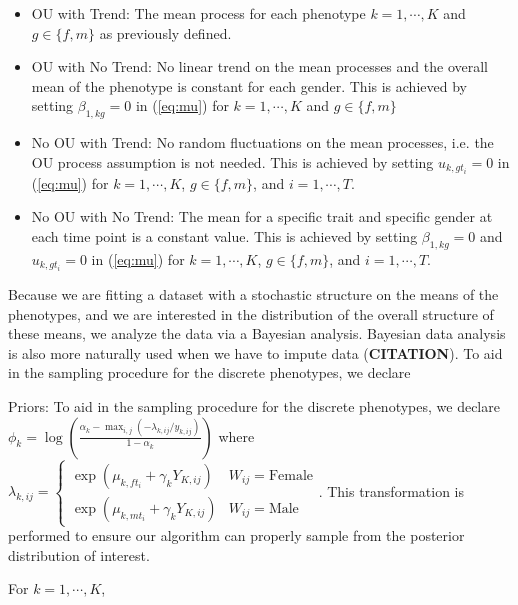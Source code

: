 \documentclass[
  12pt,
]{article}
\begin{document}
\begin{itemize}
\item OU with Trend: The mean process for each phenotype $k=1,\cdots,K$ and $g \in \{f,m\}$ as previously defined.
\item OU with No Trend: No linear trend on the mean processes and the overall mean of the phenotype is constant for each gender. This is achieved by setting $\beta_{1,kg} = 0$ in (\ref{eq:mu}) for $k = 1,\cdots,K$ and $g \in \{f,m\}$
\item No OU with Trend: No random fluctuations on the mean processes, i.e. the OU process assumption is not needed. This is achieved by setting $u_{k,gt_i} = 0$ in (\ref{eq:mu}) for $k = 1,\cdots,K$, $g \in \{f,m\}$, and $i = 1,\cdots,T$.
\item No OU with No Trend: The mean for a specific trait and specific gender at each time point is a constant value. This is achieved by setting $\beta_{1,kg} = 0$ and $u_{k,gt_i} = 0$ in (\ref{eq:mu}) for $k = 1,\cdots,K$, $g \in \{f,m\}$, and $i = 1,\cdots,T$.
\end{itemize}

Because we are fitting a dataset with a stochastic structure on the
means of the phenotypes, and we are interested in the distribution of
the overall structure of these means, we analyze the data via a Bayesian
analysis. Bayesian data analysis is also more naturally used when we
have to impute data (\textbf{CITATION}). To aid in the sampling
procedure for the discrete phenotypes, we declare

Priors: To aid in the sampling procedure for the discrete phenotypes, we
declare
\(\phi_k = \log\left(\frac{\alpha_k - \max_{i,j}(-\lambda_{k,ij}/y_{k,ij})}{1 - \alpha_k}\right)\)
where
\(\lambda_{k,ij} = \left\{\begin{array}{cc} \exp(\mu_{k,ft_i} + \gamma_k Y_{K,ij}) & W_{ij} = \text{Female} \\ \exp(\mu_{k,mt_i} + \gamma_k Y_{K,ij}) & W_{ij} = \text{Male} \end{array}\right.\).
This transformation is performed to ensure our algorithm can properly
sample from the posterior distribution of interest.

For \(k = 1,\cdots,K\),
\end{document}
